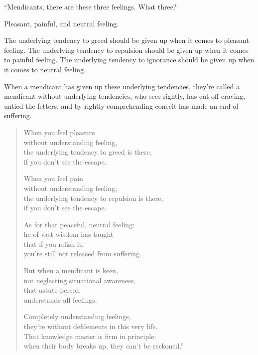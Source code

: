 \documentclass[12pt,openany]{book}%
\begin{document}
“Mendicants, there are these three feelings. What three? 

Pleasant, painful, and neutral feeling. 

The underlying tendency to greed should be given up when it comes to pleasant feeling. The underlying tendency to repulsion should be given up when it comes to painful feeling. The underlying tendency to ignorance should be given up when it comes to neutral feeling. 

When a mendicant has given up these underlying tendencies, they’re called a mendicant without underlying tendencies, who sees rightly, has cut off craving, untied the fetters, and by rightly comprehending conceit has made an end of suffering. 

\begin{verse}%
When you feel pleasure \\
without understanding feeling, \\
the underlying tendency to greed is there, \\
if you don’t see the escape. 

When you feel pain \\
without understanding feeling, \\
the underlying tendency to repulsion is there, \\
if you don’t see the escape. 

As for that peaceful, neutral feeling: \\
he of vast wisdom has taught \\
that if you relish it, \\
you’re still not released from suffering. 

But when a mendicant is keen, \\
not neglecting situational awareness, \\
that astute person \\
understands all feelings. 

Completely understanding feelings, \\
they’re without defilements in this very life. \\
That knowledge master is firm in principle; \\
when their body breaks up, they can’t be reckoned.” 

%
\end{verse}
\end{document}
